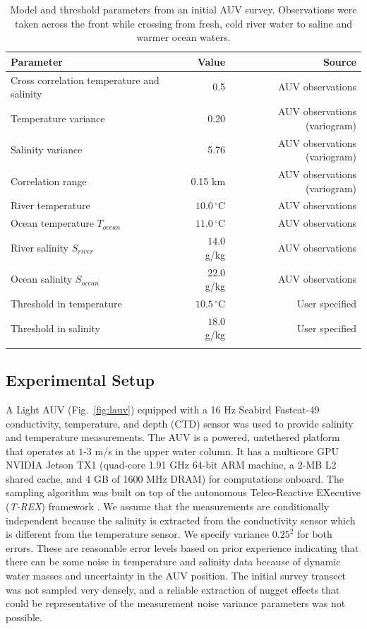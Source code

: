 \documentclass[aoas]{imsart}
\begin{document}
\begin{table}[!h]
\centering
\begin{tabular}{lrr}
\toprule
Parameter & Value & Source\\
\midrule
\rowcolor{Gray}
Cross correlation temperature and salinity & 0.5 & AUV observations\\
Temperature variance &  0.20 & AUV observations (variogram)\\
\rowcolor{Gray}
Salinity variance &  5.76 & AUV observations (variogram)\\
Correlation range  & 0.15 km & AUV observations (variogram)\\
\rowcolor{Gray}
River temperature  & $10.0\,^{\circ}\mathrm{C}$ & AUV observations\\
Ocean temperature $T_{ocean}$ & $11.0\,^{\circ}\mathrm{C}$ & AUV observations\\
\rowcolor{Gray}
River salinity $S_{river}$ & $14.0$ g/kg & AUV observations\\
Ocean salinity $S_{ocean}$ & $22.0$ g/kg & AUV observations\\
\rowcolor{Gray}
Threshold in temperature & $10.5\,^{\circ}\mathrm{C}$ & User specified \\
Threshold in salinity & $18.0$ g/kg & User specified \\
\rowcolor{Gray}
\bottomrule
\end{tabular}
\caption{Model and threshold parameters from an initial AUV
  survey. Observations were taken across the front while crossing from
  fresh, cold river water to saline and warmer ocean waters.}
\label{tab:experiment_param}
\end{table}


\subsection{Experimental Setup}

A Light AUV \citep{sousa2012lauv} (Fig.~\ref{fig:lauv}) equipped with
a 16 Hz Seabird Fastcat-49 conductivity, temperature, and depth (CTD)
sensor was used to provide salinity and temperature measurements.  The
AUV is a powered, untethered platform that operates at $1$-$3$ m/s in
the upper water column. It has a multicore GPU NVIDIA Jetson TX1
(quad-core 1.91 GHz 64-bit ARM machine, a 2-MB L2 shared cache, and 4 GB of 1600 MHz DRAM) for computations onboard.  The sampling algorithm
was built on top of the autonomous Teleo-Reactive EXecutive
(\textit{T-REX}) framework \citep{py10,Rajan12,Rajan12b}. We assume
that the measurements are conditionally independent because the
salinity is extracted from the conductivity sensor which is different
from the temperature sensor. We specify variance $0.25^2$ for both
errors. These are reasonable error levels based on prior experience \citep{fossuminformation} indicating that there can be
some noise in temperature and salinity data because of
dynamic water masses and uncertainty in the AUV position. The initial
survey transect was not sampled very densely, and a reliable extraction
of nugget effects that could be representative of the measurement noise variance parameters was not possible.
\end{document}
